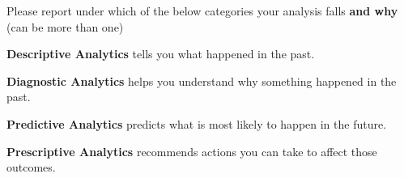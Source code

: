 \documentclass[
]{article}
\begin{document}
Please report under which of the below categories your analysis falls
\textbf{and why} (can be more than one)

\textbf{Descriptive Analytics} tells you what happened in the past.

\textbf{Diagnostic Analytics} helps you understand why something
happened in the past.

\textbf{Predictive Analytics} predicts what is most likely to happen in
the future.

\textbf{Prescriptive Analytics} recommends actions you can take to
affect those outcomes.
\end{document}
